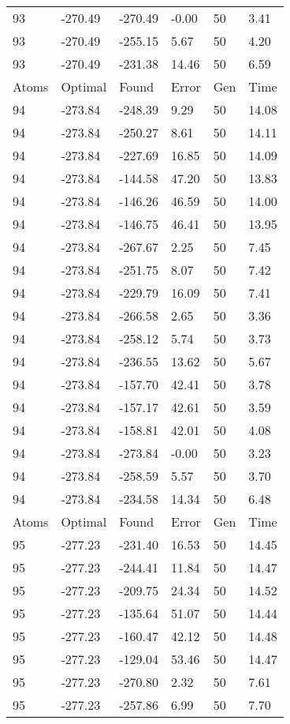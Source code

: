 \documentclass{report}
\begin{document}
\begin{appendix}
\begin{longtable}{llllll}
93 & -270.49 & -270.49 & -0.00 & 50 & 3.41 \\
93 & -270.49 & -255.15 & 5.67 & 50 & 4.20 \\
93 & -270.49 & -231.38 & 14.46 & 50 & 6.59 \\
Atoms & Optimal & Found & Error & Gen & Time \\
94 & -273.84 & -248.39 & 9.29 & 50 & 14.08 \\
94 & -273.84 & -250.27 & 8.61 & 50 & 14.11 \\
94 & -273.84 & -227.69 & 16.85 & 50 & 14.09 \\
94 & -273.84 & -144.58 & 47.20 & 50 & 13.83 \\
94 & -273.84 & -146.26 & 46.59 & 50 & 14.00 \\
94 & -273.84 & -146.75 & 46.41 & 50 & 13.95 \\
94 & -273.84 & -267.67 & 2.25 & 50 & 7.45 \\
94 & -273.84 & -251.75 & 8.07 & 50 & 7.42 \\
94 & -273.84 & -229.79 & 16.09 & 50 & 7.41 \\
94 & -273.84 & -266.58 & 2.65 & 50 & 3.36 \\
94 & -273.84 & -258.12 & 5.74 & 50 & 3.73 \\
94 & -273.84 & -236.55 & 13.62 & 50 & 5.67 \\
94 & -273.84 & -157.70 & 42.41 & 50 & 3.78 \\
94 & -273.84 & -157.17 & 42.61 & 50 & 3.59 \\
94 & -273.84 & -158.81 & 42.01 & 50 & 4.08 \\
94 & -273.84 & -273.84 & -0.00 & 50 & 3.23 \\
94 & -273.84 & -258.59 & 5.57 & 50 & 3.70 \\
94 & -273.84 & -234.58 & 14.34 & 50 & 6.48 \\
Atoms & Optimal & Found & Error & Gen & Time \\
95 & -277.23 & -231.40 & 16.53 & 50 & 14.45 \\
95 & -277.23 & -244.41 & 11.84 & 50 & 14.47 \\
95 & -277.23 & -209.75 & 24.34 & 50 & 14.52 \\
95 & -277.23 & -135.64 & 51.07 & 50 & 14.44 \\
95 & -277.23 & -160.47 & 42.12 & 50 & 14.48 \\
95 & -277.23 & -129.04 & 53.46 & 50 & 14.47 \\
95 & -277.23 & -270.80 & 2.32 & 50 & 7.61 \\
95 & -277.23 & -257.86 & 6.99 & 50 & 7.70 \\

\end{longtable}
\end{appendix}
\end{document}
